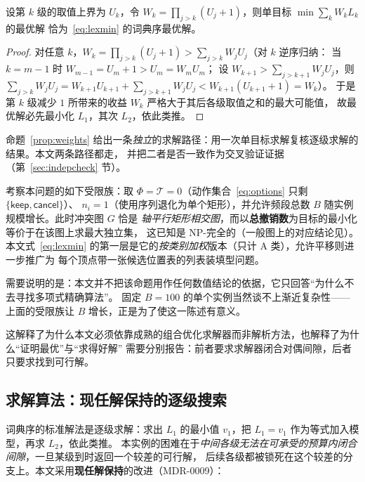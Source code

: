 \begin{proposition}[词典序与分离权重的等价]\label{prop:weights}
设第 $k$ 级的取值上界为 $U_k$，令 $W_k=\prod_{j>k}(U_j+1)$，则单目标 $\min\sum_k W_k L_k$ 的最优解
恰为~\eqref{eq:lexmin} 的词典序最优解。
\end{proposition}
\begin{proof}
对任意 $k$，$W_k=\prod_{j>k}(U_j+1)>\sum_{j>k}W_j U_j$（对 $k$ 逆序归纳：
当 $k=m-1$ 时 $W_{m-1}=U_m+1>U_m=W_mU_m$；
设 $W_{k+1}>\sum_{j>k+1}W_jU_j$，则
$\sum_{j>k}W_jU_j=W_{k+1}U_{k+1}+\sum_{j>k+1}W_jU_j<W_{k+1}(U_{k+1}+1)=W_k$）。
于是第 $k$ 级减少 $1$ 所带来的收益 $W_k$ 严格大于其后各级取值之和的最大可能值，
故最优解必先最小化 $L_1$，其次 $L_2$，依此类推。
\end{proof}

命题~\ref{prop:weights} 给出一条\emph{独立}的求解路径：用一次单目标求解复核逐级求解的结果。本文两条路径都走，
并把二者是否一致作为交叉验证证据（第~\ref{sec:indepcheck} 节）。

\begin{proposition}[受限族的计算复杂性]\label{prop:nphard}
考察本问题的如下受限族：取 $\Phi=\mathcal{T}=0$（动作集合~\eqref{eq:options} 只剩 $\{\textsf{keep},\textsf{cancel}\}$）、
$n_i=1$（使用序列退化为单个矩形），并允许频段总数 $B$ 随实例规模增长。此时冲突图 $G$ 恰是
\emph{轴平行矩形相交图}，而以\textbf{总撤销数}为目标的最小化等价于在该图上求最大独立集，
这已知是 NP-完全的\cite{fowler1981}（一般图上的对应结论见\cite{karp1972,garey1979}）。
本文式~\eqref{eq:lexmin} 的第一层是它的\emph{按类别加权}版本（只计 A 类），允许平移则进一步推广为
每个顶点带一张候选位置表的列表装填型问题。
\end{proposition}

需要说明的是：本文并不把该命题用作任何数值结论的依据，它只回答“为什么不去寻找多项式精确算法”。
固定 $B=100$ 的单个实例当然谈不上渐近复杂性——上面的受限族让 $B$ 增长，正是为了使这一陈述有意义。

这解释了为什么本文必须依靠成熟的组合优化求解器而非解析方法，也解释了为什么“证明最优”与“求得好解”
需要分别报告：前者要求求解器闭合对偶间隙，后者只要求找到可行解。

\subsection{求解算法：现任解保持的逐级搜索}
\label{sec:q2alg}

词典序的标准解法是逐级求解：求出 $L_1$ 的最小值 $v_1$，把 $L_1=v_1$ 作为等式加入模型，再求 $L_2$，依此类推。
本实例的困难在于\emph{中间各级无法在可承受的预算内闭合间隙}，一旦某级到时返回一个较差的可行解，
后续各级都被锁死在这个较差的分支上。本文采用\textbf{现任解保持}的改进（MDR-0009）：

